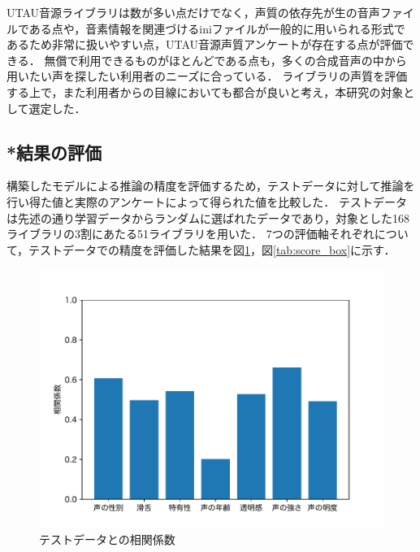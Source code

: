 \documentclass[a4j,8pt,twocolumn]{extarticle}
\begin{document}
UTAU音源ライブラリは数が多い点だけでなく，声質の依存先が生の音声ファイルである点や，音素情報を関連づけるiniファイルが一般的に用いられる形式であるため非常に扱いやすい点，UTAU音源声質アンケートが存在する点が評価できる．
無償で利用できるものがほとんどである点も，多くの合成音声の中から用いたい声を探したい利用者のニーズに合っている．
ライブラリの声質を評価する上で，また利用者からの目線においても都合が良いと考え，本研究の対象として選定した．

\subsection{*結果の評価}
構築したモデルによる推論の精度を評価するため，テストデータに対して推論を行い得た値と実際のアンケートによって得られた値を比較した．
テストデータは先述の通り学習データからランダムに選ばれたデータであり，対象とした168ライブラリの3割にあたる51ライブラリを用いた．
7つの評価軸それぞれについて，テストデータでの精度を評価した結果を図\ref{tab:score_coor}，図\ref{tab:score_box}に示す．

\begin{figure}[h]
  \centering
  \includegraphics[width=\linewidth]{fig/model_quality_coor.pdf}
  \caption{テストデータとの相関係数}
  \label{tab:score_coor}
\end{figure}
\end{document}
